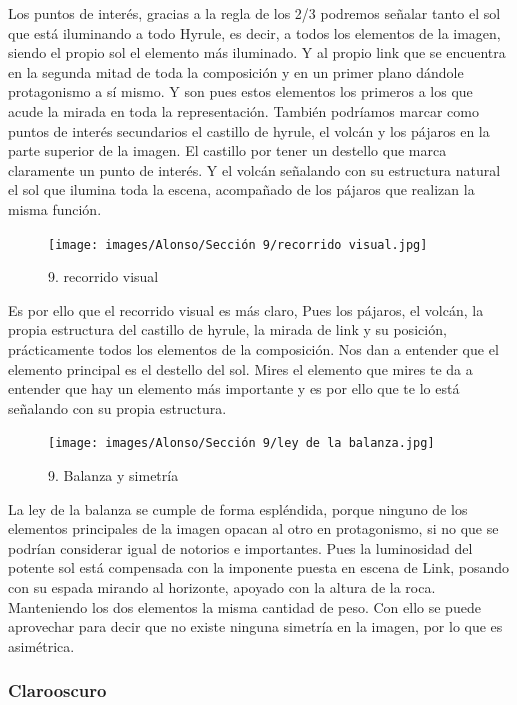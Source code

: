 \documentclass[12pt]{article}
\begin{document}
    Los puntos de interés, gracias a la regla de los 2/3 podremos señalar tanto el sol que está iluminando a todo Hyrule, es decir, a todos los elementos de la imagen, siendo el propio sol el elemento más iluminado. Y al propio link que se encuentra en la segunda mitad de toda la composición y en un primer plano dándole protagonismo a sí mismo.
    Y son pues estos elementos los primeros a los que acude la mirada en toda la representación. También podríamos marcar como puntos de interés secundarios el castillo de hyrule, el volcán y los pájaros en la parte superior de la imagen. El castillo por tener un destello que marca claramente un punto de interés. Y el volcán señalando con su estructura natural el sol que ilumina toda la escena, acompañado de los pájaros que realizan la misma función.

    \begin{figure}[H]
      \centering
      \texttt{[image: images/Alonso/Sección 9/recorrido visual.jpg]}
      \caption{\small 9. recorrido visual}
    \end{figure}

    Es por ello que el recorrido visual es más claro, Pues los pájaros, el volcán, la propia estructura del castillo de hyrule, la mirada de link y su posición, prácticamente todos los elementos de la composición. Nos dan a entender que el elemento principal es el destello del sol. Mires el elemento que mires te da a entender que hay un elemento más importante y es por ello que te lo está señalando con su propia estructura.

    \begin{figure}[H]
      \centering
      \texttt{[image: images/Alonso/Sección 9/ley de la balanza.jpg]}
      \caption{\small 9. Balanza y simetría}
    \end{figure}

    La ley de la balanza se cumple de forma espléndida, porque ninguno de los elementos principales de la imagen opacan al otro en protagonismo, si no que se podrían considerar igual de notorios e importantes. Pues la luminosidad del potente sol está compensada con la imponente puesta en escena de Link, posando con su espada mirando al horizonte, apoyado con la altura de la roca. Manteniendo los dos elementos la misma cantidad de peso. Con ello se puede aprovechar para decir que no existe ninguna simetría en la imagen, por lo que es asimétrica.

        \subsubsection{Clarooscuro}
\end{document}
